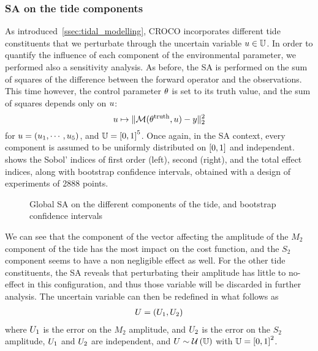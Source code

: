 \documentclass[../../Main_ManuscritThese.tex]{subfiles}
\newcommand{\CROCO}{CROCO}
\newcommand\imgpath{/home/victor/acadwriting/Manuscrit/Text/Chapter5/img/}
\begin{document}
\subsubsection{SA on the tide components}
\label{ssec:SA_tide}
As introduced~\cref{ssec:tidal_modelling}, \CROCO{} incorporates
different tide constituents that we perturbate through the uncertain
variable $u\in\mathbb{U}$. In order to quantify the influence of each
component of the environmental parameter, we performed also a
sensitivity analysis. As before, the SA is performed on the sum of
squares of the difference between the forward operator and the
observations. This time however, the control parameter $\theta$ is set to its
truth value, and the sum of squares depends only on $u$:
\begin{equation}
  u \mapsto  \| \mathcal{M}(\theta^{\mathrm{truth}}, u) - y \|_2^2
\end{equation}
for $u = (u_1,\cdots,u_5)$, and $\Uspace = \interval{0}{1}^5$.
Once again, in the SA context, every component is assumed to be
uniformly distributed on $\interval{0}{1}$ and independent.
 shows the Sobol' indices of first order (left),
second (right), and the total effect indices, along with bootstrap
confidence intervals, obtained with a design of experiments of
\num{2888} points.
\begin{figure}[ht]
  \centering
  
  \caption[SA on the tide components]{\label{fig:SA_tides} Global SA
    on the different components of the tide, and bootstrap confidence
    intervals}
\end{figure}

We can see that the component of the vector affecting the amplitude of
the $M_2$ component of the tide has the most impact on the cost
function, and the $S_2$ component seems to have a non negligible
effect as well. For the other tide constituents, the SA reveals that
perturbating their amplitude has little to no-effect in this
configuration, and thus those variable will be discarded in further
analysis. The uncertain variable can then be redefined in what follows as
\begin{align}
  \UU = (\UU_1, \UU_2)%
\end{align}
where $U_1$ is the error on the $M_2$ amplitude, and $U_2$ is the
error on the $S_2$ amplitude, $U_1$ and $U_2$ are independent, and
$U \sim \mathcal{U}\left(\mathbb{U}\right)$ with
$\Uspace = \interval{0}{1}^2$.
\end{document}
